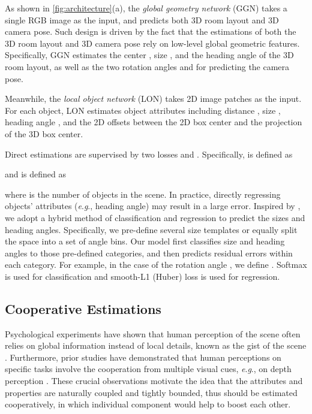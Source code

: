 \documentclass{article}
\makeatletter
\newcommand{\eg}{\textit{e}.\textit{g}.\@\xspace}
\makeatother
\begin{document}
As shown in \autoref{fig:architecture}(a), the \emph{global geometry network} (GGN) takes a single RGB image as the input, and predicts both 3D room layout and 3D camera pose. Such design is driven by the fact that the estimations of both the 3D room layout and 3D camera pose rely on low-level global geometric features. Specifically, GGN estimates the center , size , and the heading angle  of the 3D room layout, as well as the two rotation angles  and  for predicting the camera pose.

Meanwhile, the \emph{local object network} (LON) takes 2D image patches as the input. For each object, LON estimates object attributes including distance , size , heading angle , and the 2D offsets  between the 2D box center and the projection of the 3D box center.

Direct estimations are supervised by two losses  and . Specifically,  is defined as

and  is defined as

where  is the number of objects in the scene. In practice, directly regressing objects' attributes (\eg, heading angle) may result in a large error. Inspired by \citep{ren2015faster,mousavian20173d,qi2017frustum}, we adopt a hybrid method of classification and regression to predict the sizes and heading angles. Specifically, we pre-define several size templates or equally split the space into a set of angle bins. Our model first classifies size and heading angles to those pre-defined categories, and then predicts residual errors within each category. For example, in the case of the rotation angle , we define . Softmax is used for classification and smooth-L1 (Huber) loss is used for regression.

\subsection{Cooperative Estimations}

Psychological experiments have shown that human perception of the scene often relies on global information instead of local details, known as the gist of the scene \citep{oliva2005gist,oliva2006building}. Furthermore, prior studies have demonstrated that human perceptions on specific tasks involve the cooperation from multiple visual cues, \eg, on depth perception \citep{landy1995measurement,jacobs2002determines}. These crucial observations motivate the idea that the attributes and properties are naturally coupled and tightly bounded, thus should be estimated cooperatively, in which individual component would help to boost each other.
\end{document}
